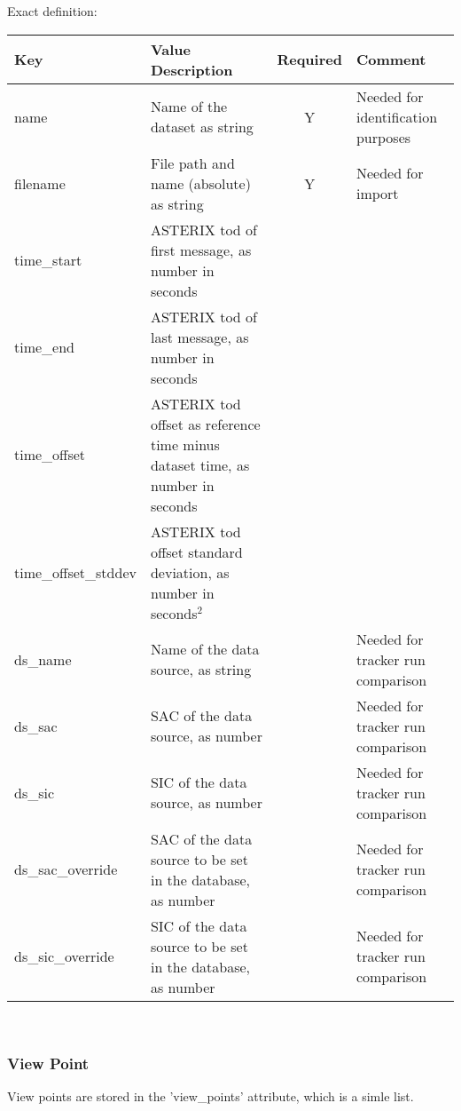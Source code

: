 Exact definition:

\begin{center}
 \begin{table}[H]
  \begin{tabularx}{\textwidth}{ | l | X | c | X | }
    \hline
    \textbf{Key} & \textbf{Value Description} & \textbf{Required} & \textbf{Comment} \\ \hline
    name & Name of the dataset as string & Y & Needed for identification purposes \\ \hline
    filename & File path and name (absolute) as string & Y & Needed for import \\ \hline
    time\_start & ASTERIX tod of first message, as number in seconds & & \\ \hline
    time\_end & ASTERIX tod of last message, as number in seconds & & \\ \hline
    time\_offset & ASTERIX tod offset as reference time minus dataset time, as number in seconds & & \\ \hline
    time\_offset\_stddev & ASTERIX tod offset standard deviation, as number in seconds$^2$ & & \\ \hline
    ds\_name & Name of the data source, as string &  & Needed for tracker run comparison \\ \hline
    ds\_sac & SAC of the data source, as number & & Needed for tracker run comparison \\ \hline
    ds\_sic & SIC of the data source, as number & & Needed for tracker run comparison \\ \hline
    ds\_sac\_override & SAC of the data source to be set in the database, as number & & Needed for tracker run comparison \\ \hline
    ds\_sic\_override & SIC of the data source to be set in the database, as number & & Needed for tracker run comparison \\ \hline
\end{tabularx}
\end{table}
\end{center}
\ \\

\subsubsection{View Point}

View points are stored in the 'view\_points' attribute, which is a simle list. \\

